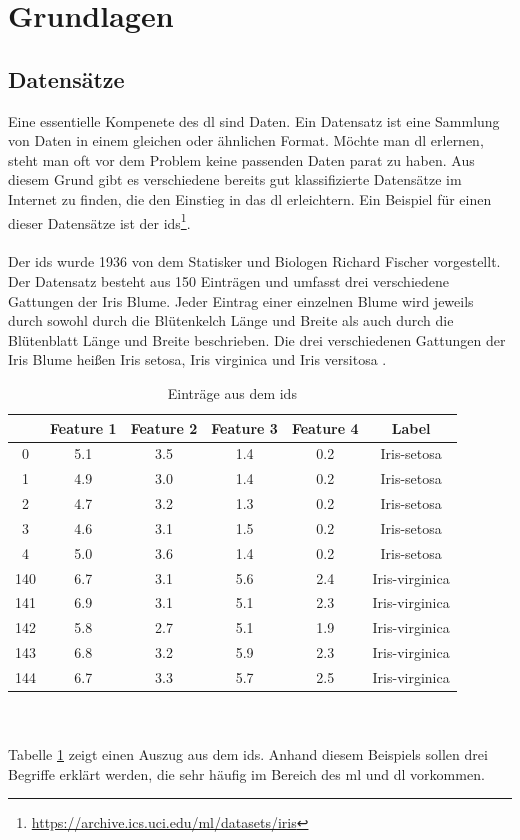 \documentclass[conference, german]{IEEEtran}
\begin{document}
\section{Grundlagen}
\subsection{Datensätze}
Eine essentielle Kompenete des \ac{dl} sind Daten.
Ein Datensatz ist eine Sammlung von Daten in einem gleichen oder ähnlichen Format.
Möchte man \ac{dl} erlernen, steht man oft vor dem Problem keine passenden Daten parat zu haben.
Aus diesem Grund gibt es verschiedene bereits gut klassifizierte Datensätze im Internet zu finden, die den Einstieg in das \ac{dl} erleichtern. 
Ein Beispiel für einen dieser Datensätze ist der \ac{ids}\footnote{\url{https://archive.ics.uci.edu/ml/datasets/iris}}.
\\\\
Der \ac{ids} wurde 1936 von dem Statisker und Biologen Richard Fischer vorgestellt.
Der Datensatz besteht aus 150 Einträgen und umfasst drei verschiedene Gattungen der Iris Blume.
Jeder Eintrag einer einzelnen Blume wird jeweils durch sowohl durch die Blütenkelch Länge und Breite als auch durch die Blütenblatt Länge und Breite beschrieben.
Die drei verschiedenen Gattungen der Iris Blume heißen Iris setosa, Iris virginica und Iris versitosa \citep[vgl.][]{WIKI01}.
\begin{table}
	\caption{Einträge aus dem \ac{ids}}
	\label{table:ids}
	\centering
	\begin{tabular}{c c c c c c}
	\toprule
	{} &    Feature 1 & Feature 2 & Feature 3 & Feature 4 & Label \\
	\midrule
	0 &  5.1 &  3.5 &  1.4 &  0.2 &  Iris-setosa \\
	1 &  4.9 &  3.0 &  1.4 &  0.2 &  Iris-setosa \\
	2 &  4.7 &  3.2 &  1.3 &  0.2 &  Iris-setosa \\
	3 &  4.6 &  3.1 &  1.5 &  0.2 &  Iris-setosa \\
	4 &  5.0 &  3.6 &  1.4 &  0.2 &  Iris-setosa \\
	\midrule
	140 &  6.7 &  3.1 &  5.6 &  2.4 &  Iris-virginica \\
	141 &  6.9 &  3.1 &  5.1 &  2.3 &  Iris-virginica \\
	142 &  5.8 &  2.7 &  5.1 &  1.9 &  Iris-virginica \\
	143 &  6.8 &  3.2 &  5.9 &  2.3 &  Iris-virginica \\
	144 &  6.7 &  3.3 &  5.7 &  2.5 &  Iris-virginica \\
	\bottomrule
\end{tabular}
\end{table}
\\\\
Tabelle \ref{table:ids} zeigt einen Auszug aus dem \ac{ids}.
Anhand diesem Beispiels sollen drei Begriffe erklärt werden, die sehr häufig 
im Bereich des \ac{ml} und \ac{dl} vorkommen.
\end{document}
